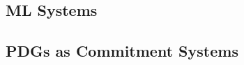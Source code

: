 \documentclass{article}
\begin{document}
\subsection{ML Systems}
\subsection{PDGs as Commitment Systems}

    

    
\end{document}
